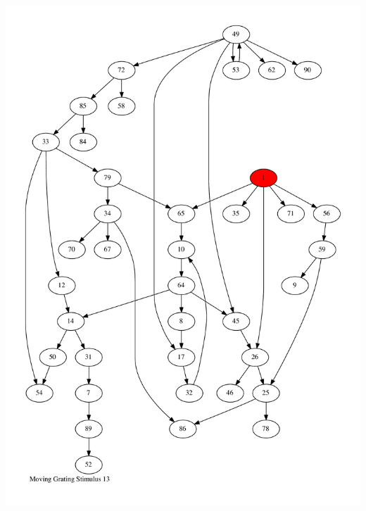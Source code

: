 \documentclass{article}
\begin{document}
\newpage
\includegraphics[max height=\textheight,max width=\textwidth]{stim_mov_grat/stim13_pp.pdf}
\end{document}
